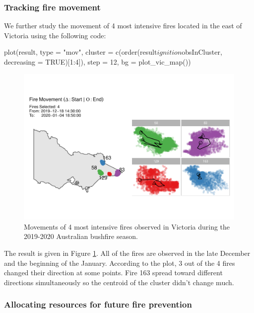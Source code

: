 \hypertarget{tracking-fire-movement}{%
\subsubsection{Tracking fire movement}\label{tracking-fire-movement}}

We further study the movement of 4 most intensive fires located in the
east of Victoria using the following code:

\begin{Schunk}
\begin{Sinput}
plot(result, 
     type = "mov", 
     cluster = c(order(result$ignition$obsInCluster, 
                       decreasing = TRUE)[1:4]), 
     step = 12, 
     bg = plot_vic_map())
\end{Sinput}
\begin{figure}

{\centering \includegraphics[width=0.8\linewidth]{clustering_paper_files/figure-latex/firemovem-1} 

}

\caption[Movements of 4 most intensive fires observed in Victoria during the 2019-2020 Australian bushfire season]{Movements of 4 most intensive fires observed in Victoria during the 2019-2020 Australian bushfire season.}\label{fig:firemovem}
\end{figure}
\end{Schunk}

The result is given in Figure \ref{fig:firemovem}. All of the fires are
observed in the late December and the beginning of the January.
According to the plot, 3 out of the 4 fires changed their direction at
some points. Fire 163 spread toward different directions simultaneously
so the centroid of the cluster didn't change much.

\hypertarget{allocating-resources-for-future-fire-prevention}{%
\subsubsection{Allocating resources for future fire
prevention}\label{allocating-resources-for-future-fire-prevention}}

